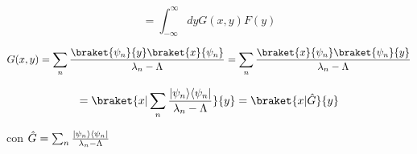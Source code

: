 \documentclass[12pt,a4paper]{article}
\DeclarePairedDelimiter\bra{\langle}{\rvert}
\DeclarePairedDelimiter\ket{\lvert}{\rangle}
\begin{document}
\begin{enumerate}
\begin{equation*}
    = \int_{-\infty}^{\infty} dy G(x,y) F(y)
\end{equation*}

\begin{equation*}
    G(x,y) = \sum_{n} \frac{\braket{\psi_{n}}{y}\braket{x}{\psi_{n}}}{\lambda_n - \Lambda} = \sum_{n} \frac{\braket{x}{\psi_{n}}\braket{\psi_{n}}{y}}{\lambda_{n} - \Lambda}
\end{equation*}

\begin{equation*}
    = \braket{x|\sum_{n} \frac{\ket{\psi_{n}}\bra{\psi_n}}{\lambda_n - \Lambda}}{y} = \braket{x|\hat{G}}{y}
\end{equation*}

con $\hat{G} = \sum_{n} \frac{\ket{\psi_{n}}\bra{\psi_{n}}}{\lambda_n - \Lambda}$
    
    
\end{enumerate}
\end{document}
